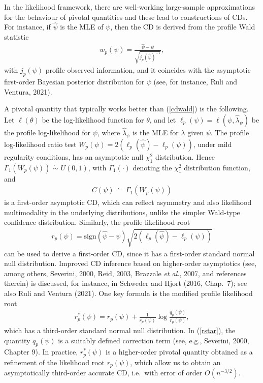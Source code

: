 \documentclass[preprint,12pt,authoryear]{elsarticle}
\begin{document}
In the likelihood framework, there are well-working large-sample approximations for the behaviour of pivotal quantities and these lead to constructions of CDs. For instance,  if $\hat\psi$ is the MLE of $\psi$, then the CD is derived from the profile Wald statistic 
\begin{eqnarray}
w_p(\psi) = \frac{\hat\psi-\psi}{\sqrt{j_p(\hat\psi)^{-1}}},
\label{cdwald}
\end{eqnarray}
with $j_p(\psi)$ profile observed information,
and it coincides with the asymptotic first-order Bayesian posterior distribution for $\psi$ (see, for instance, Ruli and Ventura, 2021). 

A pivotal quantity that typically works better than (\ref{cdwald}) is the following. Let $\ell(\theta)$ be the log-likelihood function for $\theta$, and let $\ell_p (\psi) = \ell(\psi,\hat\lambda_\psi)$ be the profile log-likelihood for $\psi$, where $\hat\lambda_\psi$ is the MLE for $\lambda$ given $\psi$. The profile  log-likelihood ratio test $W_p(\psi) = 2 (\ell_p(\hat\psi) - \ell_p(\psi))$, under mild regularity conditions, has an asymptotic null $\chi^2_1$ distribution. Hence $ \Gamma_1(W
_p(\psi)) \, \, \dot\sim \, \, U(0,1)$, with $\Gamma_1(\cdot)$ denoting the $\chi^2_1$ distribution function, and 
\begin{eqnarray}
C(\psi) \, \dot{=} \, \Gamma_1(W_p(\psi))\label{asyCD_loglik}
\end{eqnarray}
is a first-order asymptotic CD, which can reflect asymmetry and also likelihood multimodality in the underlying distributions, unlike the simpler Wald-type confidence distribution. Similarly, the profile likelihood root
\begin{eqnarray*}
r_p (\psi) = \text{sign} (\hat\psi-\psi) \sqrt{2(\ell_p(\hat\psi)-\ell_p(\psi))}
\label{r}
\end{eqnarray*}
can be used to derive a first-order CD, since it has a first-order standard normal null distribution. 
Improved CD inference based on higher-order asymptotics (see, among others, Severini, 2000, Reid, 2003, Brazzale {\em et al.}, 2007, and references therein) is discussed, for instance, in Schweder and Hjort  (2016, Chap.\ 7); see also Ruli and Ventura (2021). One key formula is the modified profile likelihood root
\begin{eqnarray}
r_p^* (\psi) = r_p(\psi) + \frac{1}{r_p(\psi)} \log \frac{q_p(\psi)}{r_p(\psi)},
\label{rstar}
\end{eqnarray} 
which has a third-order standard normal null distribution. In (\ref{rstar}), the quantity $q_p(\psi)$ is a suitably defined correction term (see, e.g., Severini, 2000, Chapter 9). In practice, $r^*_p(\psi)$ is a higher-order pivotal quantity obtained as a refinement of the likelihood root $r_p(\psi)$, which allow us to obtain  an asymptotically third-order accurate CD, i.e.\ with error of order $O(n^{-3/2})$. 
\end{document}
